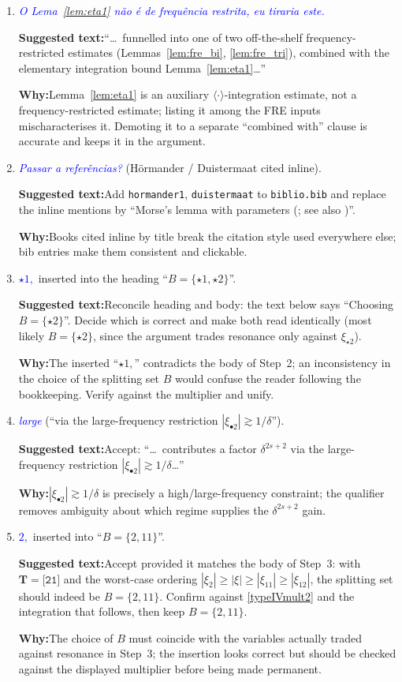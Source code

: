 \documentclass[11pt]{article}
\newcommand{\TT}{\mathbf{T}}
\newcommand{\jap}[1]{\langle #1\rangle}
\newcommand{\bul}{\bullet}
\newcommand{\tree}[1]{\texttt{[#1]}}
\newcommand{\com}[1]{\textit{\textcolor{blue}{#1}}}
\newcommand{\sugg}[1]{\par\smallskip\textbf{Suggested text:}\quad #1}
\newcommand{\why}[1]{\par\smallskip\textbf{Why:}\quad #1\par\medskip}
\begin{document}
\begin{enumerate}[leftmargin=*]

\item[\textbf{L1873}] \com{O Lema~\ref{lem:eta1} n\~ao \'e de frequ\^encia
restrita, eu tiraria este.}
\sugg{``\dots\ funnelled into one of two off-the-shelf frequency-restricted
estimates \cite{CLS,COS} (Lemmas~\ref{lem:fre_bi}, \ref{lem:fre_tri}),
combined with the elementary integration bound Lemma~\ref{lem:eta1}\dots''}
\why{Lemma~\ref{lem:eta1} is an auxiliary $\jap{\cdot}$-integration estimate,
not a frequency-restricted estimate; listing it among the FRE inputs
mischaracterises it. Demoting it to a separate ``combined with'' clause is
accurate and keeps it in the argument.}

\item[\textbf{L2011}] \com{Passar a refer\^encias?} (H\"ormander /
Duistermaat cited inline).
\sugg{Add \texttt{hormander1}, \texttt{duistermaat} to \texttt{biblio.bib}
and replace the inline mentions by ``Morse's lemma with parameters
(\cite[Lemma~C.6.1]{hormander1}; see also \cite[\S3.4]{duistermaat})''.}
\why{Books cited inline by title break the citation style used everywhere
else; bib entries make them consistent and clickable.}

\item[\textbf{L2073}] \com{$\star1,$} inserted into the heading
``$B=\{\star1,\star2\}$''.
\sugg{Reconcile heading and body: the text below says ``Choosing
$B=\{\star2\}$''. Decide which is correct and make both read identically
(most likely $B=\{\star2\}$, since the argument trades resonance only against
$\xi_{\star2}$).}
\why{The inserted ``$\star1,$'' contradicts the body of Step~2; an
inconsistency in the choice of the splitting set $B$ would confuse the reader
following the bookkeeping. Verify against the multiplier and unify.}

\item[\textbf{L2074}] \com{large} (``via the large-frequency restriction
$|\xi_{\bul2}|\gtrsim1/\delta$'').
\sugg{Accept: ``\dots\ contributes a factor $\delta^{2s+2}$ via the
large-frequency restriction $|\xi_{\bul2}|\gtrsim1/\delta$\dots''}
\why{$|\xi_{\bul2}|\gtrsim1/\delta$ is precisely a high/large-frequency
constraint; the qualifier removes ambiguity about which regime supplies the
$\delta^{2s+2}$ gain.}

\item[\textbf{L2092}] \com{$2,$} inserted into ``$B=\{2,11\}$''.
\sugg{Accept provided it matches the body of Step~3: with $\TT=\tree{21}$ and the
worst-case ordering $|\xi_2|\ge|\xi|\ge|\xi_{11}|\ge|\xi_{12}|$, the splitting
set should indeed be $B=\{2,11\}$. Confirm against \eqref{typeIVmult2} and
the integration that follows, then keep $B=\{2,11\}$.}
\why{The choice of $B$ must coincide with the variables actually traded
against resonance in Step~3; the insertion looks correct but should be
checked against the displayed multiplier before being made permanent.}


\end{enumerate}
\end{document}
